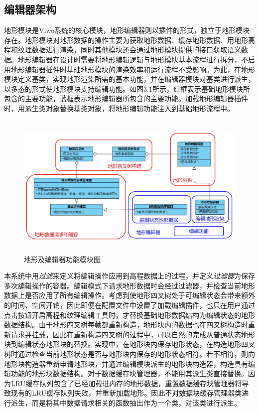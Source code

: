 \subsection{编辑器架构}
地形模块是Viwo系统的核心模块，地形编辑器则以插件的形式，独立于地形模块存在。地形模块对地形数据的操作主要为获取地形数据、缓存地形数据、用地形高程和纹理数据进行渲染，同时其他模块还会通过地形模块提供的接口获取语义数据。地形编辑器在设计时需要将地形编辑逻辑与地形模块基本流程进行拆分，不启用地形编辑器插件时基础地形模块的渲染效率和运行流程不受影响。为此，在地形模块定义基类，实现地形渲染所需的基本功能，并在编辑器模块对基类进行派生，以多态的形式使地形模块支持编辑功能。如图3.1所示，红框表示基础地形模块所包含的主要功能，蓝框表示地形编辑器所包含的主要功能。加载地形编辑器插件时，用派生类对象替换基类对象，将地形编辑功能注入到基础地形流程中。\par

\begin{figure}[htbp]
\centering
\includegraphics[height=7cm,width=13.2cm]{figures/editorStructure.JPG}
\caption{地形及编辑器功能模块图}
\end{figure}
本系统中用\textit{过滤}\supercite{summer}来定义将编辑操作应用到高程数据上的过程，并定义\textit{过滤器}为保存多次编辑操作的容器。编辑模式下请求地形数据时会经过过滤器，并检查当前地形数据上是否应用了所有编辑操作。考虑到使地形四叉树处于可编辑状态会带来额外的时间、空间开销，因此即便在配置文件中设置了加载编辑插件，也只在用户通过点击按钮开启高程和纹理编辑工具时，才替换基础地形数据结构为编辑状态的地形数据结构。由于地形四叉树每帧都重新构造，地形块内的数据也在四叉树构造时重新请求并挂载，因此在重新构造四叉树的过程中，可以自然的完成从普通状态地形块到编辑状态地形块的替换。实现中，在地形块内保存地形状态，在构造地形四叉树时通过检查当前地形状态是否与地形块内保存的地形状态相符。若不相符，则向地形块构造器重新申请地形块，并通过编辑模块派生的地形块构造器，构造具有编辑功能的地形块数据结构。对于数据缓存块管理器，不能用其派生类直接替换。因为LRU缓存队列包含了已经加载进内存的地形数据，重置数据缓存块管理器将导致现有的LRU缓存队列失效，并重新加载地形。因此不对数据块缓存管理器类进行派生，而是将其中数据请求相关的函数抽出作为一个类，对该类进行派生。
